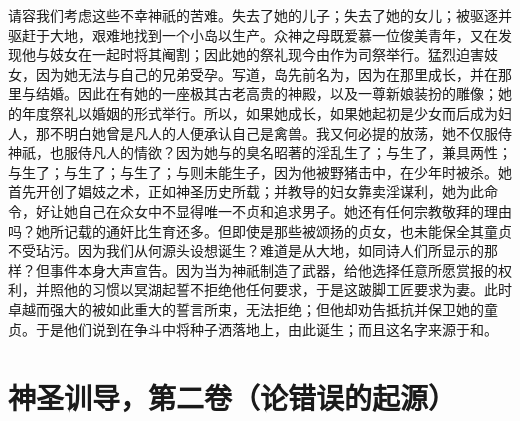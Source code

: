请容我们考虑这些不幸神祇的苦难。失去了她的儿子；失去了她的女儿；被驱逐并驱赶于大地，艰难地找到一个小岛以生产。众神之母既爱慕一位俊美青年，又在发现他与妓女在一起时将其阉割；因此她的祭礼现今由作为司祭举行。猛烈迫害妓女，因为她无法与自己的兄弟受孕。写道，岛先前名为，因为在那里成长，并在那里与结婚。因此在有她的一座极其古老高贵的神殿，以及一尊新娘装扮的雕像；她的年度祭礼以婚姻的形式举行。所以，如果她成长，如果她起初是少女而后成为妇人，那不明白她曾是凡人的人便承认自己是禽兽。我又何必提的放荡，她不仅服侍神祇，也服侍凡人的情欲？因为她与的臭名昭著的淫乱生了；与生了，兼具两性；与生了；与生了；与生了；与则未能生子，因为他被野猪击中，在少年时被杀。她首先开创了娼妓之术，正如神圣历史所载；并教导的妇女靠卖淫谋利，她为此命令，好让她自己在众女中不显得唯一不贞和追求男子。她还有任何宗教敬拜的理由吗？她所记载的通奸比生育还多。但即使是那些被颂扬的贞女，也未能保全其童贞不受玷污。因为我们从何源头设想诞生？难道是从大地，如同诗人们所显示的那样？但事件本身大声宣告。因为当为神祇制造了武器，给他选择任意所愿赏报的权利，并照他的习惯以冥湖起誓不拒绝他任何要求，于是这跛脚工匠要求为妻。此时卓越而强大的被如此重大的誓言所束，无法拒绝；但他却劝告抵抗并保卫她的童贞。于是他们说到在争斗中将种子洒落地上，由此诞生；而且这名字来源于和。\par



\section{神圣训导，第二卷（论错误的起源）}


